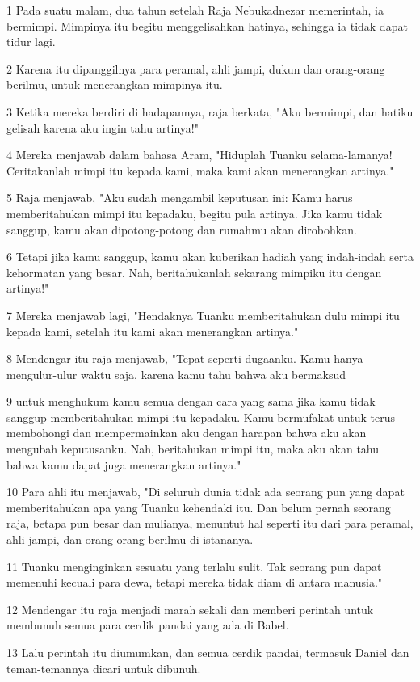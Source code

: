 \par 1 Pada suatu malam, dua tahun setelah Raja Nebukadnezar memerintah, ia bermimpi. Mimpinya itu begitu menggelisahkan hatinya, sehingga ia tidak dapat tidur lagi.
\par 2 Karena itu dipanggilnya para peramal, ahli jampi, dukun dan orang-orang berilmu, untuk menerangkan mimpinya itu.
\par 3 Ketika mereka berdiri di hadapannya, raja berkata, "Aku bermimpi, dan hatiku gelisah karena aku ingin tahu artinya!"
\par 4 Mereka menjawab dalam bahasa Aram, "Hiduplah Tuanku selama-lamanya! Ceritakanlah mimpi itu kepada kami, maka kami akan menerangkan artinya."
\par 5 Raja menjawab, "Aku sudah mengambil keputusan ini: Kamu harus memberitahukan mimpi itu kepadaku, begitu pula artinya. Jika kamu tidak sanggup, kamu akan dipotong-potong dan rumahmu akan dirobohkan.
\par 6 Tetapi jika kamu sanggup, kamu akan kuberikan hadiah yang indah-indah serta kehormatan yang besar. Nah, beritahukanlah sekarang mimpiku itu dengan artinya!"
\par 7 Mereka menjawab lagi, "Hendaknya Tuanku memberitahukan dulu mimpi itu kepada kami, setelah itu kami akan menerangkan artinya."
\par 8 Mendengar itu raja menjawab, "Tepat seperti dugaanku. Kamu hanya mengulur-ulur waktu saja, karena kamu tahu bahwa aku bermaksud
\par 9 untuk menghukum kamu semua dengan cara yang sama jika kamu tidak sanggup memberitahukan mimpi itu kepadaku. Kamu bermufakat untuk terus membohongi dan mempermainkan aku dengan harapan bahwa aku akan mengubah keputusanku. Nah, beritahukan mimpi itu, maka aku akan tahu bahwa kamu dapat juga menerangkan artinya."
\par 10 Para ahli itu menjawab, "Di seluruh dunia tidak ada seorang pun yang dapat memberitahukan apa yang Tuanku kehendaki itu. Dan belum pernah seorang raja, betapa pun besar dan mulianya, menuntut hal seperti itu dari para peramal, ahli jampi, dan orang-orang berilmu di istananya.
\par 11 Tuanku menginginkan sesuatu yang terlalu sulit. Tak seorang pun dapat memenuhi kecuali para dewa, tetapi mereka tidak diam di antara manusia."
\par 12 Mendengar itu raja menjadi marah sekali dan memberi perintah untuk membunuh semua para cerdik pandai yang ada di Babel.
\par 13 Lalu perintah itu diumumkan, dan semua cerdik pandai, termasuk Daniel dan teman-temannya dicari untuk dibunuh.
